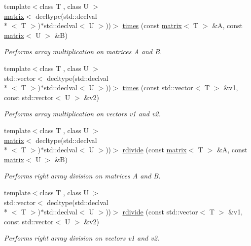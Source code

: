 \begin{DoxyCompactItemize}
\item 
{\footnotesize template$<$class T , class U $>$ }\\\hyperlink{classkeycpp_1_1matrix}{matrix}$<$ decltype(std\-::declval\\*
$<$ T $>$)$\ast$std\-::declval$<$ U $>$))$>$ \hyperlink{namespacekeycpp_ac1ff99e34619478096c271b38df1f3d7}{times} (const \hyperlink{classkeycpp_1_1matrix}{matrix}$<$ T $>$ \&A, const \hyperlink{classkeycpp_1_1matrix}{matrix}$<$ U $>$ \&B)
\begin{DoxyCompactList}\small\item\em Performs array multiplication on matrices A and B. \end{DoxyCompactList}\item 
{\footnotesize template$<$class T , class U $>$ }\\std\-::vector$<$ decltype(std\-::declval\\*
$<$ T $>$)$\ast$std\-::declval$<$ U $>$))$>$ \hyperlink{namespacekeycpp_a90d5fd4f9f7c52f16425105995655e9d}{times} (const std\-::vector$<$ T $>$ \&v1, const std\-::vector$<$ U $>$ \&v2)
\begin{DoxyCompactList}\small\item\em Performs array multiplication on vectors v1 and v2. \end{DoxyCompactList}\item 
{\footnotesize template$<$class T , class U $>$ }\\\hyperlink{classkeycpp_1_1matrix}{matrix}$<$ decltype(std\-::declval\\*
$<$ T $>$)$\ast$std\-::declval$<$ U $>$))$>$ \hyperlink{namespacekeycpp_aacd37d195541b2313b753b6e8839f916}{rdivide} (const \hyperlink{classkeycpp_1_1matrix}{matrix}$<$ T $>$ \&A, const \hyperlink{classkeycpp_1_1matrix}{matrix}$<$ U $>$ \&B)
\begin{DoxyCompactList}\small\item\em Performs right array division on matrices A and B. \end{DoxyCompactList}\item 
{\footnotesize template$<$class T , class U $>$ }\\std\-::vector$<$ decltype(std\-::declval\\*
$<$ T $>$)$\ast$std\-::declval$<$ U $>$))$>$ \hyperlink{namespacekeycpp_af234cd07a4e1d649629a6b83dbe113ff}{rdivide} (const std\-::vector$<$ T $>$ \&v1, const std\-::vector$<$ U $>$ \&v2)
\begin{DoxyCompactList}\small\item\em Performs right array division on vectors v1 and v2. \end{DoxyCompactList}\item 

\end{DoxyCompactItemize}
